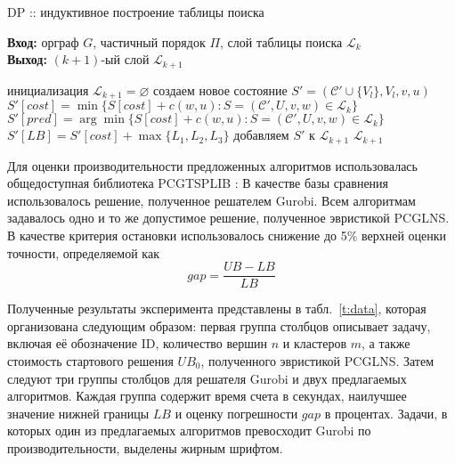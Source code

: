 \begin{algorithm}[t]
  \caption{DP ::  индуктивное построение таблицы поиска}\label{alg:A2}
  \textbf{Вход:} орграф $G$, частичный порядок $\Pi$, слой таблицы поиска $\mathcal L_k$\\
  \textbf{Выход:} $(k+1)$-ый слой $\mathcal L_{k+1}$
  \begin{algorithmic}[1]
  \STATE инициализация $\mathcal L_{k+1}=\varnothing$
        \STATE создаем новое состояние $S'=(\mathcal C'\cup\{V_l\}, V_l, v, u)$
        \STATE $S'[cost] = \min\{S[cost] + c(w,u)\colon S=(\mathcal C',U,v,w)\in\mathcal L_k\}$
        \STATE $S'[pred] = \arg\min\{S[cost] + c(w,u)\colon S=(\mathcal C',U,v,w)\in\mathcal L_k\}$
        \STATE $S'[LB] = S'[cost] + \max\{L_1,L_2,L_3\}$
          \label{alg:A2:LB}
            \label{alg:A2:cut}
          \STATE добавляем $S'$ к $\mathcal L_{k+1}$
        \ENDIF
      \ENDIF
      \ENDFOR
    \ENDFOR
  \ENDFOR
  \RETURN $\mathcal L_{k+1}$
  \end{algorithmic}
\end{algorithm}

Для оценки производительности предложенных алгоритмов
использовалась общедоступная библиотека
PCGTSPLIB
\autocite{SALMAN2020163}:
В качестве базы сравнения использовалось решение,
полученное решателем Gurobi.
Всем алгоритмам задавалось одно и то же
допустимое решение,
полученное эвристикой
PCGLNS.
В качестве критерия остановки
использовалось снижение до 5\%
верхней оценки точности,
определяемой как
$$
gap = \frac{UB - LB}{LB}
$$

Полученные результаты эксперимента
представлены в табл.~\ref{t:data},
которая организована следующим образом:
первая группа столбцов описывает
задачу,
включая её обозначение ID,
количество вершин $n$
и кластеров $m$,
а также стоимость стартового решения $UB_0$,
полученного эвристикой PCGLNS.
Затем следуют три группы столбцов
для решателя Gurobi
и двух предлагаемых алгоритмов.
Каждая группа содержит время
счета в секундах,
наилучшее значение нижней границы
$LB$
и оценку погрешности $gap$
в процентах.
Задачи,
в которых один из предлагаемых
алгоритмов превосходит Gurobi по производительности,
выделены жирным шрифтом.

